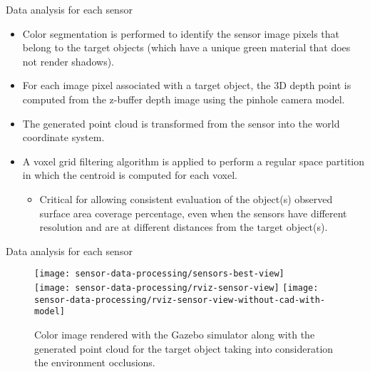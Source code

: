 \begin{frame}{Data analysis for each sensor}
		\begin{itemize}
			\item Color segmentation is performed to identify the sensor image pixels that belong to the target objects (which have a unique green material that does not render shadows).
			\item For each image pixel associated with a target object, the 3D depth point is computed from the z-buffer depth image using the pinhole camera model.
			\item The generated point cloud is transformed from the sensor into the world coordinate system.
			\item A voxel grid filtering algorithm is applied to perform a regular space partition in which the centroid is computed for each voxel.
			\begin{itemize}
				\item Critical for allowing consistent evaluation of the object(s) observed surface area coverage percentage, even when the sensors have different resolution and are at different distances from the target object(s).
			\end{itemize}
		\end{itemize}
\end{frame}


\begin{frame}{Data analysis for each sensor}
	\begin{figure}
		\centering
		\texttt{[image: sensor-data-processing/sensors-best-view]}\\
		\vspace{0.5em}
		\texttt{[image: sensor-data-processing/rviz-sensor-view]}\hspace{2em}
		\texttt{[image: sensor-data-processing/rviz-sensor-view-without-cad-with-model]}
		\caption{Color image rendered with the Gazebo simulator along with the generated point cloud for the target object taking into consideration the environment occlusions.}
	\end{figure}
\end{frame}


